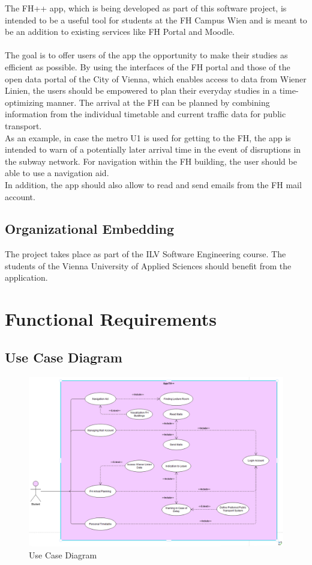 \documentclass{scrreprt}
\begin{document}
The FH++ app, which is being developed as part of this software project, is intended to be a useful tool for students at the FH Campus Wien and is meant to be an addition to existing services like FH Portal and Moodle. \\ \\
The goal is to offer users of the app the opportunity to make their studies as efficient as possible.
By using the interfaces of the FH portal and those of the open data portal of the City of Vienna, which enables access to data from Wiener Linien,
the users should be empowered to plan their everyday studies in a time-optimizing manner.
The arrival at the FH can be planned by combining information from the individual timetable and current traffic data for public transport. \\
As an example, in case the metro U1 is used for getting to the FH, the app is intended to warn of a potentially later arrival time in the event of disruptions in the subway network.
For navigation within the FH building, the user should be able to use a navigation aid. \\
In addition, the app should also allow to read and send emails from the FH mail account.

\section{Organizational Embedding}
The project takes place as part of the ILV Software Engineering course. The students of the Vienna University of Applied Sciences should benefit from the application.

\chapter{Functional Requirements}

\section{Use Case Diagram}

\begin{figure} [h]
	\centering
	\includegraphics[width=1\linewidth]{pics/usecasediagram}
	\caption{Use Case Diagram}
	\label{fig:usecasediagram}
\end{figure}
\end{document}
